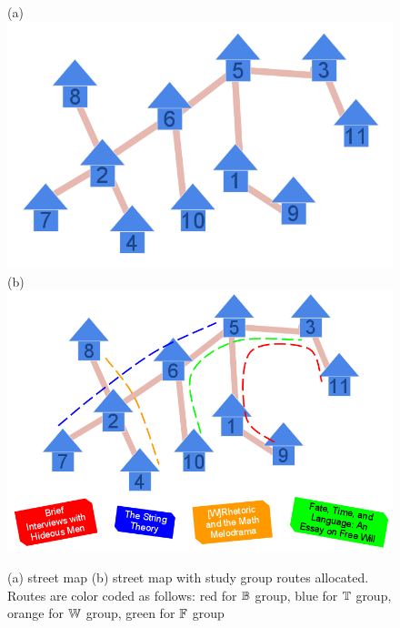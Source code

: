 \documentclass[MS]             %
              {iitmdiss_as}    %
\begin{document}
\begin{figure}[htbp] %
 \centering
  (a) \includegraphics[scale=0.2]{../img/1_infinite_loop.png}
  (b) \includegraphics[scale=0.2]{../img/2_infinite_loop_BTWF.png}

 \label{fig:streetmap}
 \caption{\figtabsize (a) {\residenceblock} street map (b)
   {\residenceblock} street map with study group routes
   allocated. Routes are color coded as follows: red for
   \textcolor{red}{$\mathbb{B}$} group, blue for \textcolor{blue}{$\mathbb{T}$}
   group, orange for \textcolor{yellow}{$\mathbb{W}$} group, green for
   \textcolor{green}{$\mathbb{F}$} group}


\end{figure}
\end{document}
